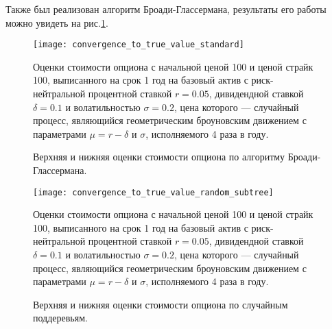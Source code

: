 Также был реализован алгоритм Броади-Глассермана, результаты его работы можно увидеть на рис.\ref{fig:true_value_test_standard}.
\begin{figure}[htpb]
    \centering
	\texttt{[image: convergence\_to\_true\_value\_standard]}
	\caption{Верхняя и нижняя оценки стоимости опциона по алгоритму Броади-Глассермана.}
	\label{fig:true_value_test_standard}
	\footnotesize{Оценки стоимости опциона с начальной ценой 100 и ценой страйк 100, выписанного на срок 1 год на базовый актив с риск-нейтральной процентной ставкой $r = 0.05$, дивидендной ставкой $\delta = 0.1$ и волатильностью $\sigma=0.2$, цена которого --- случайный процесс, являющийся геометрическим броуновским движением с параметрами $\mu = r - \delta$ и $\sigma$, исполняемого 4 раза в году.}
\end{figure}
\begin{figure}[htpb]
    \centering
    \texttt{[image: convergence\_to\_true\_value\_random\_subtree]}
    \caption{Верхняя и нижняя оценки стоимости опциона по случайным поддеревьям.}
    \label{fig:random_subtree_modified_ev}
    \footnotesize{Оценки стоимости опциона с начальной ценой 100 и ценой страйк 100, выписанного на срок 1 год на базовый актив с риск-нейтральной процентной ставкой $r = 0.05$, дивидендной ставкой $\delta = 0.1$ и волатильностью $\sigma=0.2$, цена которого --- случайный процесс, являющийся геометрическим броуновским движением с параметрами $\mu = r - \delta$ и $\sigma$, исполняемого 4 раза в году.}
\end{figure}

